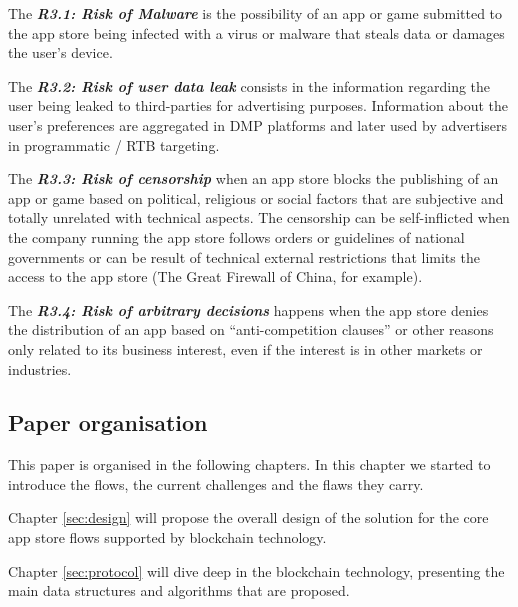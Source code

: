 \begin{tcolorbox}[enhanced jigsaw,sharp corners, drop fuzzy shadow=ShadowColor]

The {\bf\em R3.1: Risk of Malware} is the possibility of an app or game submitted to the app store being infected with a virus or malware that steals data or damages the user's device.

The {\bf\em R3.2: Risk of user data leak} consists in the information regarding the user being leaked to third-parties for advertising purposes. Information about the user's preferences are aggregated in DMP platforms and later used by advertisers in programmatic / RTB targeting.


The {\bf\em R3.3: Risk of censorship} when an app store blocks the publishing of an app or game based on political, religious or social factors that are subjective and totally unrelated with technical aspects. The censorship can be self-inflicted when the company running the app store follows orders or guidelines of national governments or can be result of technical external restrictions that limits the access to the app store (The Great Firewall of China, for example).

The {\bf\em R3.4: Risk of arbitrary decisions} happens when the app store denies the distribution of an app based on ``anti-competition clauses'' \cite{PlayTermsService} or other reasons only related to its business interest, even if the interest is in other markets or industries.

\end{tcolorbox}

\subsection{Paper organisation}

This paper is organised in the following chapters. In this chapter we started to introduce the flows, the current challenges and the flaws they carry. 

\medskip

Chapter \ref{sec:design} will propose the overall design of the solution for the core app store flows supported by blockchain technology.

\medskip

Chapter \ref{sec:protocol} will dive deep in the blockchain technology, presenting the main data structures and algorithms that are proposed.

